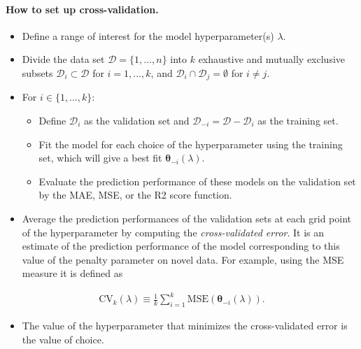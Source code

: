 \documentclass[%
oneside,                 %
final,                   %
10pt]{article}
\begin{document}
\paragraph{How to set up cross-validation.}
\begin{itemize}
\item Define a range of interest for the  model hyperparameter(s) $\lambda$.

\item Divide the data set $\mathcal{D} = \{1, \ldots, n\}$ into $k$ exhaustive and mutually exclusive subsets $\mathcal{D}_{i} \subset \mathcal{D}$ for $i=1,\ldots,k$, and $\mathcal{D}_{i} \cap \mathcal{D}_{j} = \emptyset$ for $i \neq j$.

\item For $i \in \{1, \ldots, k\}$:
\begin{itemize}

  \item Define $\mathcal{D}_{i}$ as the validation set and $\mathcal{D}_{-i} = \mathcal{D} - \mathcal{D}_i$ as the training set.

  \item Fit the model for each choice of the hyperparameter using the training set, which will give a best fit $\bm{\theta}_{-i}(\lambda)$.

  \item Evaluate the prediction performance of these models on the validation set by the MAE, MSE, or the R2 score function. 

\end{itemize}

\noindent
\item Average the prediction performances of the validation sets at each grid point of the hyperparameter by computing the \emph{cross-validated error}. It is an estimate of the prediction performance of the model corresponding to this value of the penalty parameter on novel data. For example, using the MSE measure it is defined as
\end{itemize}

\noindent
\begin{align*}
\mathrm{CV}_k(\lambda) \equiv
\frac{1}{k} \sum_{i = 1}^k \mathrm{MSE} \left( \bm{\theta}_{-i}(\lambda) \right).
\end{align*}

\begin{itemize}
\item The value of the hyperparameter that minimizes the cross-validated error is the value of choice. 
\end{itemize}
\end{document}
